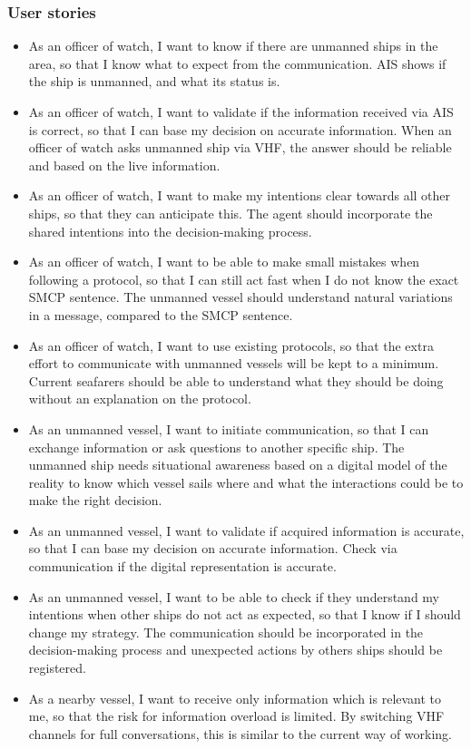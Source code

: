 \subsubsection{User stories}
\begin{itemize}
	\item As an officer of watch, I want to know if there are unmanned ships in the area, so that I know what to expect from the communication. \ac{AIS} shows if the ship is unmanned, and what its status is.
	
	\item As an officer of watch, I want to validate if the information received via \ac{AIS} is correct, so that I can base my decision on accurate information. When an officer of watch asks unmanned ship via \ac{VHF}, the answer should be reliable and based on the live information.
	
	\item As an officer of watch, I want to make my intentions clear towards all other ships, so that they can anticipate this. The agent should incorporate the shared intentions into the decision-making process.
	
	\item As an officer of watch, I want to be able to make small mistakes when following a protocol, so that I can still act fast when I do not know the exact \ac{SMCP} sentence. The unmanned vessel should understand natural variations in a message, compared to the \ac{SMCP} sentence.
	
	\item As an officer of watch, I want to use existing protocols, so that the extra effort to communicate with unmanned vessels will be kept to a minimum. Current seafarers should be able to understand what they should be doing without an explanation on the protocol. 
	
	\item As an unmanned vessel, I want to initiate communication, so that I can exchange information or ask questions to another specific ship. The unmanned ship needs situational awareness based on a digital model of the reality to know which vessel sails where and what the interactions could be to make the right decision.
	
	\item As an unmanned vessel, I want to validate if acquired information is accurate, so that I can base my decision on accurate information. Check via communication if the digital representation is accurate.
	
	\item As an unmanned vessel, I want to be able to check if they understand my intentions when other ships do not act as expected, so that I know if I should change my strategy. The communication should be incorporated in the decision-making process and unexpected actions by others ships should be registered.
	
	\item As a nearby vessel, I want to receive only information which is relevant to me, so that the risk for information overload is limited. By switching \ac{VHF} channels for full conversations, this is similar to the current way of working.
\end{itemize}

